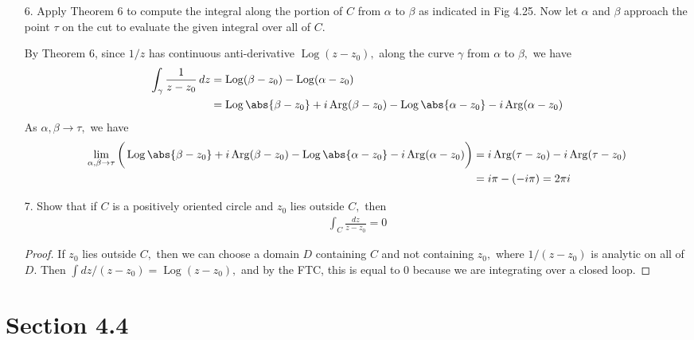 \documentclass{article}
\DeclareMathOperator{\Log}{Log}
\DeclareMathOperator{\Arg}{Arg}
\begin{document}
\begin{itemize}
	\item[6.] Apply Theorem 6 to compute the integral along the portion of $C$ from $\alpha$ to $\beta$ as indicated in Fig 4.25. Now let $\alpha$ and $\beta$ approach the point $\tau$ on the cut to evaluate the given integral over all of $C.$
		\begin{soln}
			By Theorem 6, since $1/z$ has continuous anti-derivative $\Log(z-z_0),$ along the curve $\gamma$ from $\alpha$ to $\beta,$ we have
			\begin{align*}
				\int_{\gamma} \frac{1}{z-z_0}\, dz &= \Log(\beta-z_0) - \Log(\alpha-z_0) \\
				&= \Log\abs{\beta-z_0} + i\Arg(\beta-z_0) - \Log\abs{\alpha-z_0} - i\Arg(\alpha-z_0)
			\end{align*}
			As $\alpha, \beta\to\tau,$ we have
			\begin{align*}
				\lim_{\alpha, \beta\to\tau}\bigg( \Log\abs{\beta-z_0} + i\Arg(\beta-z_0) - \Log\abs{\alpha-z_0} - i\Arg(\alpha-z_0)\bigg) &= i\Arg(\tau-z_0) - i\Arg(\tau-z_0)\\
				&= i\pi - (-i\pi) =  2\pi i
			\end{align*}
		\end{soln}

	\item[7.] Show that if $C$ is a positively oriented circle and $z_0$ lies outside $C,$ then
		\begin{align*}
			\int_C \frac{dz}{z-z_0} = 0
		\end{align*}
		\begin{proof}
			If $z_0$ lies outside $C,$ then we can choose a domain $D$ containing $C$ and not containing $z_0,$ where $1/(z-z_0)$ is analytic on all of $D.$ Then $\int dz/(z-z_0) = \Log(z-z_0),$ and by the FTC, this is equal to 0 because we are integrating over a closed loop.
		\end{proof}

\end{itemize}

\section*{Section 4.4}
\end{document}
